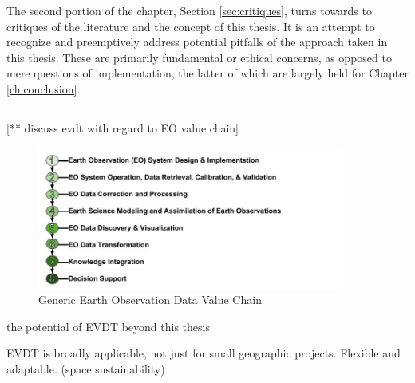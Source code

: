 The second portion of the chapter, Section \ref{sec:critiques}, turns towards to critiques of the literature and the concept of this thesis. It is an attempt to recognize and preemptively address potential pitfalls of the approach taken in this thesis. These are primarily fundamental or ethical concerns, as opposed to mere questions of implementation, the latter of which are largely held for Chapter \ref{ch:conclusion}.

\subsection{}

\subsection{}

\subsection{} \label{sec:future}


[** discuss evdt with regard to EO value chain]

\begin{figure}[h]
\centering
\includegraphics[width=0.9\textwidth]{Figures/chap6/EOChain.jpg}
\caption[Generic Earth Observation Data Value Chain]{Generic Earth Observation Data Value Chain}
\label{fig:eochain}
\end{figure}

the potential of EVDT beyond this thesis 

EVDT is broadly applicable, not just for small geographic projects. Flexible and adaptable.
 (space sustainability)




\section{}


